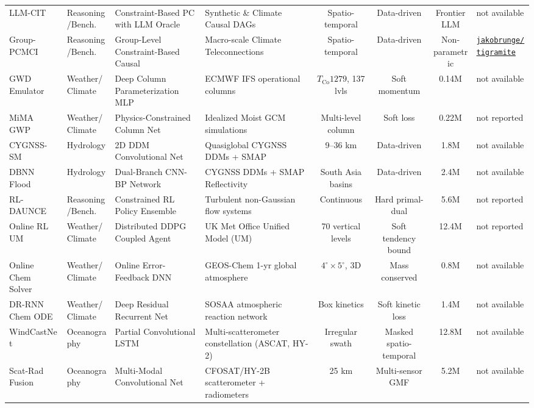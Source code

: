 \begin{table}[t]
{\begin{tabular}{@{}lp{2.0cm}p{3.0cm}p{3.4cm}cccp{3.0cm}@{}}
LLM-CIT~\cite{cohrs2024llmcausal} & Reasoning/Bench. & Constraint-Based PC with LLM Oracle & Synthetic \& Climate Causal DAGs & Spatio-temporal & Data-driven & Frontier LLM & not available \\
Group-PCMCI~\cite{wahl2023groupcausal} & Reasoning/Bench. & Group-Level Constraint-Based Causal & Macro-scale Climate Teleconnections & Spatio-temporal & Data-driven & Non-parametric & \href{https://github.com/jakobrunge/tigramite}{\texttt{jakobrunge/tigramite}} \\
GWD Emulator~\cite{chantry2021gravity} & Weather/Climate & Deep Column Parameterization MLP & ECMWF IFS operational columns & $T_{\text{Co}}1279$, 137 lvls & Soft momentum & 0.14M & not available \\
MiMA GWP~\cite{espinosa2022gravity} & Weather/Climate & Physics-Constrained Column Net & Idealized Moist GCM simulations & Multi-level column & Soft loss & 0.22M & not reported \\
CYGNSS-SM~\cite{nabi2023quasiglobal} & Hydrology & 2D DDM Convolutional Net & Quasiglobal CYGNSS DDMs + SMAP & 9--36 km & Data-driven & 1.8M & not available \\
DBNN Flood~\cite{song2022dualbranch} & Hydrology & Dual-Branch CNN-BP Network & CYGNSS DDMs + SMAP Reflectivity & South Asia basins & Data-driven & 2.4M & not available \\
RL-DAUNCE~\cite{behnoudfar2025rldaunce} & Reasoning/Bench. & Constrained RL Policy Ensemble & Turbulent non-Gaussian flow systems & Continuous & Hard primal-dual & 5.6M & not reported \\
Online RL UM~\cite{nath2026online} & Weather/Climate & Distributed DDPG Coupled Agent & UK Met Office Unified Model (UM) & 70 vertical levels & Soft tendency bound & 12.4M & not reported \\
Online Chem Solver~\cite{kelp2022online} & Weather/Climate & Online Error-Feedback DNN & GEOS-Chem 1-yr global atmosphere & $4^\circ \times 5^\circ$, 3D & Mass conserved & 0.8M & not available \\
DR-RNN Chem ODE~\cite{liu2025atmospheric} & Weather/Climate & Deep Residual Recurrent Net & SOSAA atmospheric reaction network & Box kinetics & Soft kinetic loss & 1.4M & not available \\
WindCastNet~\cite{pinto2026windcastnet} & Oceanography & Partial Convolutional LSTM & Multi-scatterometer constellation (ASCAT, HY-2) & Irregular swath & Masked spatio-temporal & 12.8M & not available \\
Scat-Rad Fusion~\cite{xiang2024scatterometer} & Oceanography & Multi-Modal Convolutional Net & CFOSAT/HY-2B scatterometer + radiometers & 25 km & Multi-sensor GMF & 5.2M & not available \\

\end{tabular}}
\end{table}
